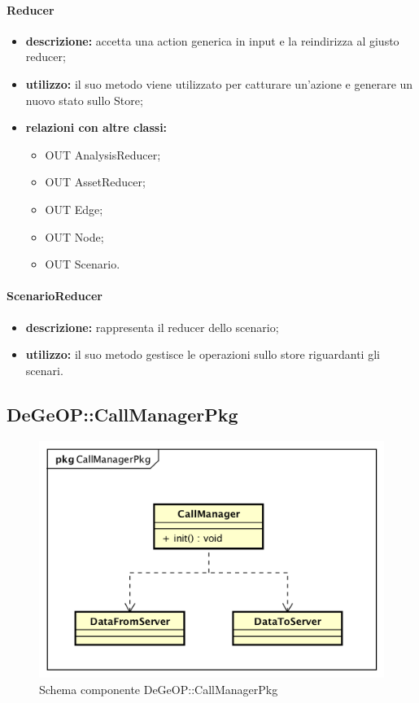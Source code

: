 \paragraph{Reducer}
\begin{itemize}
	\item \textbf{descrizione:} accetta una action generica in input e la reindirizza al giusto reducer;
	\item \textbf{utilizzo:} il suo metodo viene utilizzato per catturare un'azione e generare un nuovo stato sullo Store;
	\item \textbf{relazioni con altre classi:} 
	\begin{itemize}
		\item OUT AnalysisReducer;
		\item OUT AssetReducer;
		\item OUT Edge;
		\item OUT Node;
		\item OUT Scenario.
	\end{itemize}
\end{itemize}
\paragraph{ScenarioReducer}
\begin{itemize}
	\item \textbf{descrizione:} rappresenta il reducer dello scenario;
	\item \textbf{utilizzo:} il suo metodo gestisce le operazioni sullo store riguardanti gli scenari.
\end{itemize}
\newpage
\subsection{DeGeOP::CallManagerPkg}
\label{pkg::CallManagerPkg}
\begin{figure}[H]
	\centering
	\includegraphics[width=\textwidth]{img/PkgDiagram/CallManagerPkg.png}
	\caption{Schema componente DeGeOP::CallManagerPkg}
\end{figure}
